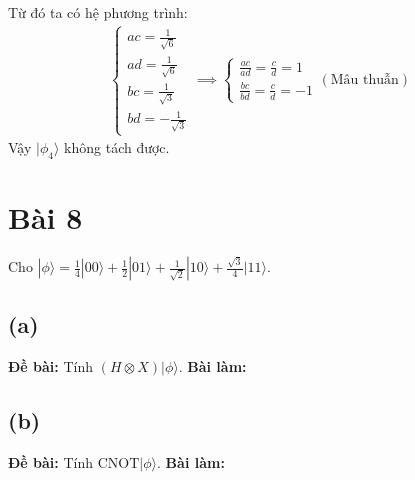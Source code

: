 Từ đó ta có hệ phương trình:
\begin{align*}
    \begin{cases}
        ac = \frac{1}{\sqrt{6}}\\
        ad = \frac{1}{\sqrt{6}}\\
        bc = \frac{1}{\sqrt{3}}\\
        bd = -\frac{1}{\sqrt{3}}
    \end{cases}
    \implies
    \begin{cases}
        \frac{ac}{ad} = \frac{c}{d} = 1\\
        \frac{bc}{bd} = \frac{c}{d} = -1
    \end{cases}
    (\text{Mâu thuẫn})
\end{align*}
Vậy $|\phi_{4}\rangle$ không tách được.

\section{Bài 8}
Cho $|\phi\rangle=\frac{1}{4}|00\rangle+\frac{1}{2}|01\rangle+\frac{1}{\sqrt{2}}|10\rangle+\frac{\sqrt{3}}{4}|11\rangle$.

\subsection{(a)}
\textbf{Đề bài:} Tính $(H\otimes X)|\phi\rangle$.
\textbf{Bài làm:}

\subsection{(b)}
\textbf{Đề bài:} Tính $\mathrm{CNOT}|\phi\rangle$.
\textbf{Bài làm:}